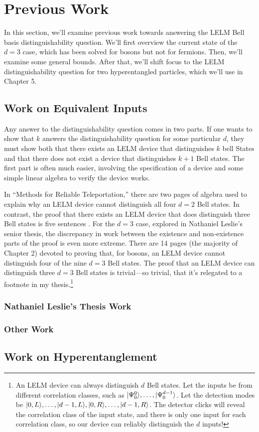 \chapter{Previous Work}

In this section, we'll examine previous work towards answering the LELM Bell basis distinguishability question. We'll first overview the current state of the $d=3$ case, which has been solved for bosons but not for fermions. Then, we'll examine some general bounds. After that, we'll shift focus to the LELM distinguishability question for two hyperentangled particles, which we'll use in Chapter 5.

\section{Work on Equivalent Inputs}

Any answer to the distinguishability question comes in two parts. If one wants to show that $k$ answers the distinguishability question for some particular $d$, they must show both that there exists an LELM device that distinguishes $k$ bell States and that there does not exist a device that distinguishes $k+1$ Bell states. The first part is often much easier, involving the specification of a device and some simple linear algebra to verify the device works.

In ``Methods for Reliable Teleportation,'' there are two pages of algebra used to explain why an LELM device cannot distinguish all four $d=2$ Bell states. In contrast, the proof that there exists an LELM device that does distinguish three Bell states is five sentences \cite{methods}. For the $d=3$ case, explored in Nathaniel Leslie's senior thesis, the discrepancy in work between the existence and non-existence parts of the proof is even more extreme. There are 14 pages (the majority of Chapter 2) devoted to proving that, for bosons, an LELM device cannot distinguish four of the nine $d=3$ Bell states. The proof that an LELM device can distinguish three $d=3$ Bell states is trivial---so trivial, that it's relegated to a footnote in my thesis.\footnote{An LELM device can always distinguish $d$ Bell states. Let the inputs be from different correlation classes, such as $| \Psi_0^0 \rangle,\ldots,| \Psi_0^{d-1} \rangle$. Let the detection modes be $| 0, L \rangle, \ldots, | d-1, L \rangle, | 0, R \rangle, \ldots, | d-1, R \rangle$. The detector clicks will reveal the correlation class of the input state, and there is only one input for each correlation class, so our device can reliably distinguish the $d$ inputs!}


\subsection{Nathaniel Leslie's Thesis Work}



\subsection{Other Work}

\section{Work on Hyperentanglement}